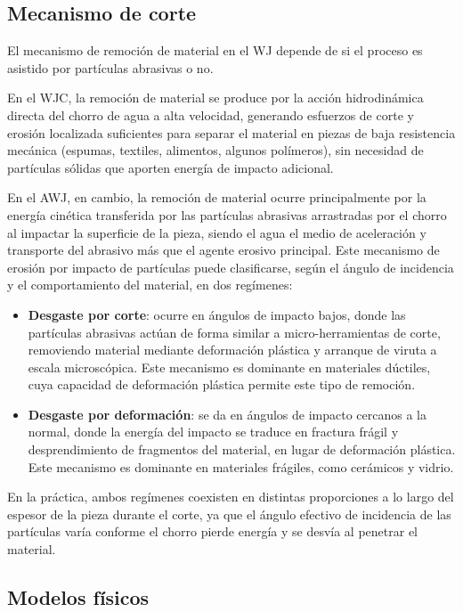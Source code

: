 \subsection{Mecanismo de corte}

El mecanismo de remoción de material en el WJ depende de si el proceso es asistido por partículas abrasivas o no.

En el WJC, la remoción de material se produce por la acción hidrodinámica directa del chorro de agua a alta velocidad, generando esfuerzos de corte y erosión localizada suficientes para separar el material en piezas de baja resistencia mecánica (espumas, textiles, alimentos, algunos polímeros), sin necesidad de partículas sólidas que aporten energía de impacto adicional.

En el AWJ, en cambio, la remoción de material ocurre principalmente por la energía cinética transferida por las partículas abrasivas arrastradas por el chorro al impactar la superficie de la pieza, siendo el agua el medio de aceleración y transporte del abrasivo más que el agente erosivo principal. Este mecanismo de erosión por impacto de partículas puede clasificarse, según el ángulo de incidencia y el comportamiento del material, en dos regímenes:

\begin{itemize}
	\item \textbf{Desgaste por corte}: ocurre en ángulos de impacto bajos, donde las partículas abrasivas actúan de forma similar a micro-herramientas de corte, removiendo material mediante deformación plástica y arranque de viruta a escala microscópica. Este mecanismo es dominante en materiales dúctiles, cuya capacidad de deformación plástica permite este tipo de remoción.
	\item \textbf{Desgaste por deformación}: se da en ángulos de impacto cercanos a la normal, donde la energía del impacto se traduce en fractura frágil y desprendimiento de fragmentos del material, en lugar de deformación plástica. Este mecanismo es dominante en materiales frágiles, como cerámicos y vidrio.
\end{itemize}

En la práctica, ambos regímenes coexisten en distintas proporciones a lo largo del espesor de la pieza durante el corte, ya que el ángulo efectivo de incidencia de las partículas varía conforme el chorro pierde energía y se desvía al penetrar el material.

\subsection{Modelos físicos}

